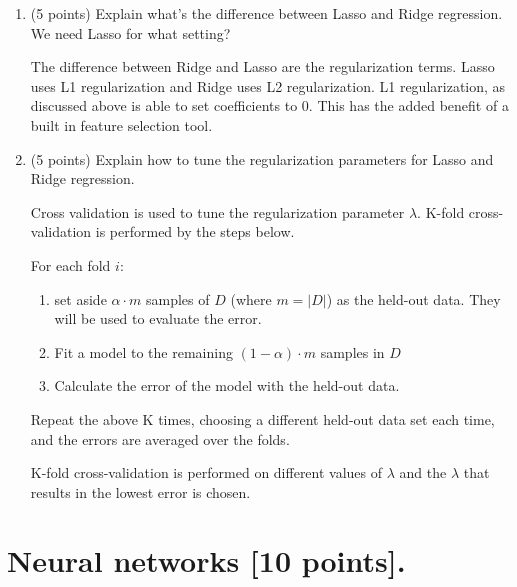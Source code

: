 \documentclass[a4paper,12pt,fleqn]{article}
\begin{document}
\begin{enumerate}
\vspace{0.15in}
\item (5 points) Explain what's the difference between Lasso and Ridge regression. We need Lasso for what setting?

\vspace{0.15in}
The difference between Ridge and Lasso are the regularization terms.  Lasso uses L1 regularization and Ridge uses L2 regularization.  L1 regularization, as discussed above is able to set coefficients to 0.  This has the added benefit of a built in feature selection tool.  


\vspace{0.15in}

\item (5 points) Explain how to tune the regularization parameters for Lasso and Ridge regression. 

\vspace{.15in}
Cross validation is used to tune the regularization parameter $\lambda$.  K-fold cross-validation is performed by the steps below.


For each fold $i$:
\begin{enumerate}[label=\arabic*)]
\item set aside $\alpha \cdot m$ samples of $D$ (where $m = |D|$) as the held-out data.  They will be used to evaluate the error.
\item Fit a model to the remaining $(1-\alpha)\cdot m$ samples in $D$
\item Calculate the error of the model with the held-out data.
\end{enumerate}
\vspace{.15in}

Repeat the above K times, choosing a different held-out data set each time, and the errors are averaged over the folds.  

K-fold cross-validation is performed on different values of $\lambda$ and the $\lambda$ that results in the lowest error is chosen.
 

\end{enumerate}


\clearpage

\section{Neural networks [10 points].}
\end{document}
